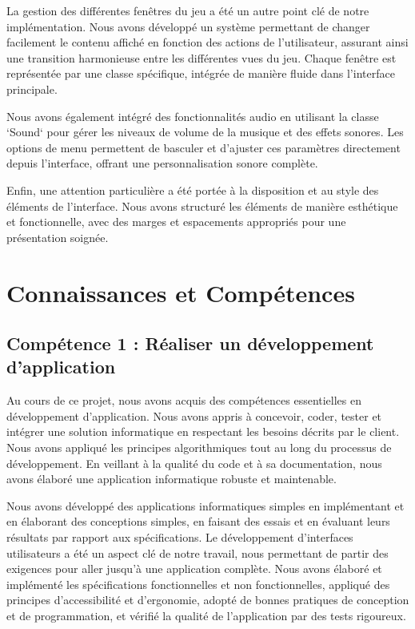 La gestion des différentes fenêtres du jeu a été un autre point clé de notre implémentation. Nous avons développé un système permettant de changer facilement le contenu affiché en fonction des actions de l'utilisateur, assurant ainsi une transition harmonieuse entre les différentes vues du jeu. Chaque fenêtre est représentée par une classe spécifique, intégrée de manière fluide dans l'interface principale.

Nous avons également intégré des fonctionnalités audio en utilisant la classe `Sound` pour gérer les niveaux de volume de la musique et des effets sonores. Les options de menu permettent de basculer et d'ajuster ces paramètres directement depuis l'interface, offrant une personnalisation sonore complète.

Enfin, une attention particulière a été portée à la disposition et au style des éléments de l'interface. Nous avons structuré les éléments de manière esthétique et fonctionnelle, avec des marges et espacements appropriés pour une présentation soignée.


\section{Connaissances et Compétences}

\subsection{Compétence 1 : Réaliser un développement d’application}

Au cours de ce projet, nous avons acquis des compétences essentielles en développement d'application. Nous avons appris à concevoir, coder, tester et intégrer une solution informatique en respectant les besoins décrits par le client. Nous avons appliqué les principes algorithmiques tout au long du processus de développement. En veillant à la qualité du code et à sa documentation, nous avons élaboré une application informatique robuste et maintenable.

Nous avons développé des applications informatiques simples en implémentant et en élaborant des conceptions simples, en faisant des essais et en évaluant leurs résultats par rapport aux spécifications. Le développement d'interfaces utilisateurs a été un aspect clé de notre travail, nous permettant de partir des exigences pour aller jusqu'à une application complète. Nous avons élaboré et implémenté les spécifications fonctionnelles et non fonctionnelles, appliqué des principes d'accessibilité et d'ergonomie, adopté de bonnes pratiques de conception et de programmation, et vérifié la qualité de l'application par des tests rigoureux.

